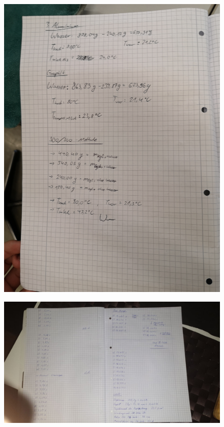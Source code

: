 \begin{figure}
    \centering
    \includegraphics[scale=0.3, angle=90]{content/Bilder/Daten2.jpg}
\end{figure}
\begin{figure}
    \centering
    \includegraphics[scale=0.3, angle=90]{content/Bilder/Daten3.jpg}
\end{figure}
